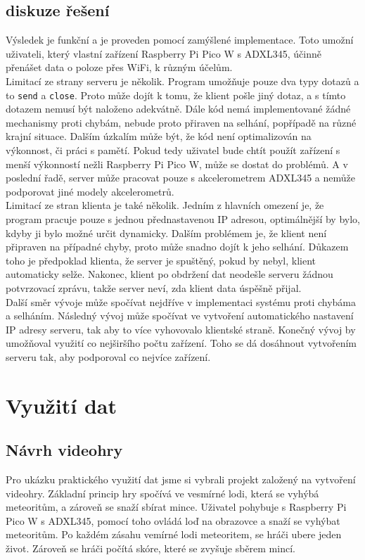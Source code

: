 \documentclass[12pt]{report}			%
\begin{document}
\subsection{diskuze řešení}
Výsledek je funkční a je proveden pomocí zamýšlené implementace. Toto umožní uživateli, který vlastní zařízení Raspberry Pi Pico W s ADXL345, účinně přenášet data o poloze přes WiFi, k různým účelům. 
\\
Limitací ze strany serveru je několik.
 Program umožňuje pouze dva typy dotazů a to \texttt{send} a \texttt{close}. Proto může dojít k tomu, že klient pošle jiný dotaz, a s tímto dotazem nemusí být naloženo adekvátně. Dále kód nemá implementované žádné mechanismy proti chybám, nebude proto přiraven na selhání, popřípadě na různé krajní situace. Dalším úzkalím může být, že kód není optimalizován na výkonnost, či práci s pamětí. Pokud tedy uživatel bude chtít použít zařízení s menší výkonností nežli Raspberry Pi Pico W, může se dostat do problémů. A v poslední řadě, server může pracovat pouze s akcelerometrem ADXL345 a nemůže podporovat jiné modely akcelerometrů.
\\
Limitací ze stran klienta je také několik. Jedním z hlavních omezení je, že program pracuje pouze s jednou přednastavenou IP adresou, optimálnější by bylo, kdyby ji bylo možné určit dynamicky. Dalším problémem je, že klient není připraven na případné chyby, proto může snadno dojít k jeho selhání. Důkazem toho je předpoklad klienta, že server je spuštěný, pokud by nebyl, klient automaticky selže. Nakonec, klient po obdržení dat neodešle serveru žádnou potvrzovací zprávu, takže server neví, zda klient data úspěšně přijal. 
\\
Další směr vývoje může spočívat nejdříve v implementaci systému proti chybáma a selháním. Následný vývoj může spočívat ve vytvoření automatického nastavení IP adresy serveru, tak aby to  více vyhovovalo klientské straně. Konečný vývoj by umožňoval využití co nejširšího počtu zařízení. Toho se dá dosáhnout vytvořením serveru tak, aby podporoval co nejvíce zařízení. 

\section{Využití dat}
\subsection{Návrh videohry}
Pro ukázku praktického využití dat jsme si vybrali projekt založený na vytvoření videohry. Základní princip hry spočívá ve vesmírné lodi, která se vyhýbá meteoritům, a zároveň se snaží sbírat mince. Uživatel pohybuje s Raspberry Pi Pico W s ADXL345, pomocí toho ovládá loď na obrazovce a snaží se vyhýbat meteoritům. Po každém zásahu vemírné lodi meteoritem, se hráči ubere jeden život. Zároveň se hráči počítá skóre, které se zvyšuje sběrem mincí.
 
\end{document}

